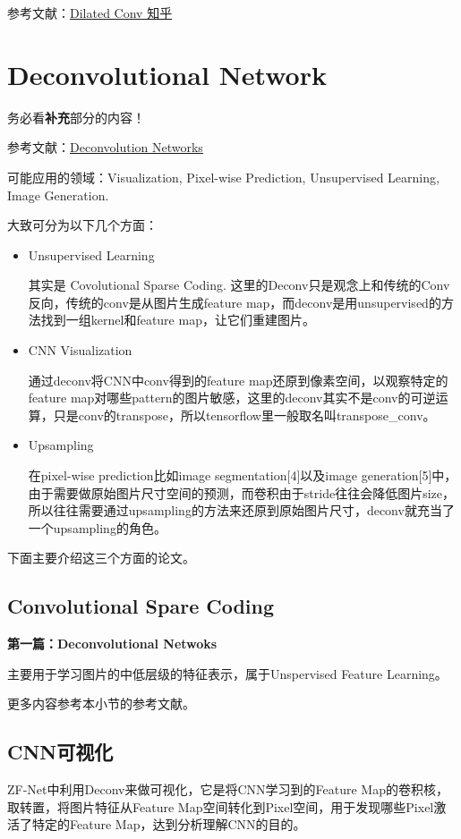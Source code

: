 参考文献：\href{https://www.zhihu.com/search?type=content\&q=dilated\%20CNN}{Dilated Conv 知乎}

\section{Deconvolutional Network}

务必看\textbf{补充}部分的内容！

参考文献：\href{https://www.zhihu.com/question/43609045/answer/132235276}{Deconvolution Networks}

可能应用的领域：Visualization, Pixel-wise Prediction, Unsupervised Learning, Image Generation.

大致可分为以下几个方面：
\begin{itemize}
\item Unsupervised Learning 

其实是 Covolutional Sparse Coding. 这里的Deconv只是观念上和传统的Conv反向，传统的conv是从图片生成feature map，而deconv是用unsupervised的方法找到一组kernel和feature map，让它们重建图片。

\item CNN Visualization

通过deconv将CNN中conv得到的feature map还原到像素空间，以观察特定的feature map对哪些pattern的图片敏感，这里的deconv其实不是conv的可逆运算，只是conv的transpose，所以tensorflow里一般取名叫transpose\_conv。

\item Upsampling

在pixel-wise prediction比如image segmentation[4]以及image generation[5]中，由于需要做原始图片尺寸空间的预测，而卷积由于stride往往会降低图片size， 所以往往需要通过upsampling的方法来还原到原始图片尺寸，deconv就充当了一个upsampling的角色。

\end{itemize}

下面主要介绍这三个方面的论文。

\subsection{Convolutional Spare Coding}

{\bfseries 第一篇：Deconvolutional Netwoks}

主要用于学习图片的中低层级的特征表示，属于Unspervised Feature Learning。

更多内容参考本小节的参考文献。

\subsection{CNN可视化}
ZF-Net中利用Deconv来做可视化，它是将CNN学习到的Feature Map的卷积核，取转置，将图片特征从Feature Map空间转化到Pixel空间，用于发现哪些Pixel激活了特定的Feature Map，达到分析理解CNN的目的。


